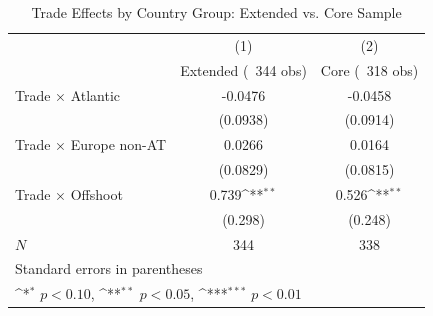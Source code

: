 \begin{table}[htbp]\centering
\def\sym#1{\ifmmode^{#1}\else\(^{#1}\)\fi}
\caption{Trade Effects by Country Group: Extended vs. Core Sample}
\begin{tabular}{l*{2}{c}}
\hline\hline
            &\multicolumn{1}{c}{(1)}&\multicolumn{1}{c}{(2)}\\
            &\multicolumn{1}{c}{Extended (~344 obs)}&\multicolumn{1}{c}{Core (~318 obs)}\\
\hline
Trade × Atlantic&     -0.0476         &     -0.0458         \\
            &    (0.0938)         &    (0.0914)         \\
[1em]
Trade × Europe non-AT&      0.0266         &      0.0164         \\
            &    (0.0829)         &    (0.0815)         \\
[1em]
Trade × Offshoot&       0.739\sym{**} &       0.526\sym{**} \\
            &     (0.298)         &     (0.248)         \\
\hline
\(N\)       &         344         &         338         \\
\hline\hline
\multicolumn{3}{l}{\footnotesize Standard errors in parentheses}\\
\multicolumn{3}{l}{\footnotesize \sym{*} \(p<0.10\), \sym{**} \(p<0.05\), \sym{***} \(p<0.01\)}\\
\end{tabular}
\end{table}
